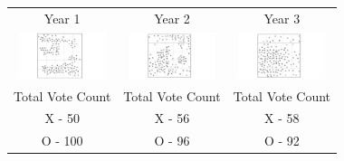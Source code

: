 \begin{tabular}{c c c }

Year 1 & Year 2 & Year 3 \\
 \includegraphics[width=1in]{assets/Gerrymandering/Gerry5x5-150-1.pdf} &  \includegraphics[width=1in]{assets/Gerrymandering/Gerry5x5-150-2.pdf} &  \includegraphics[width=1in]{assets/Gerrymandering/Gerry5x5-150-3.pdf}\\
 Total Vote Count &  Total Vote Count &  Total Vote Count\\
 X -  50& X - 56 & X  - 58\\
 O - 100 & O - 96 & O - 92
 \end{tabular}
